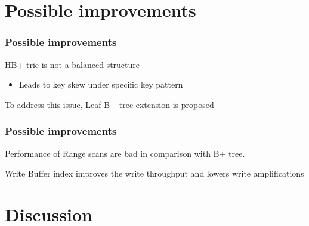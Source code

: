 \documentclass[aspectratio=169]{beamer}
\begin{document}
\section{Possible improvements}
\begin{frame}[t]
    \frametitle{Possible improvements}
    HB+ trie is not a balanced structure
    \begin{itemize}
    	\item Leads to key skew under specific key pattern
    \end{itemize}

	To address this issue, Leaf B+ tree extension is proposed
	\begin{figure}%
		\centering
		\qquad
	\end{figure}
\end{frame}
\begin{frame}[t]
	\frametitle{Possible improvements}
	Performance of Range scans are bad in comparison with B+ tree.
	
	Write Buffer index improves the write throughput and lowers write amplifications
	
\end{frame}
\section{Discussion}
\end{document}
